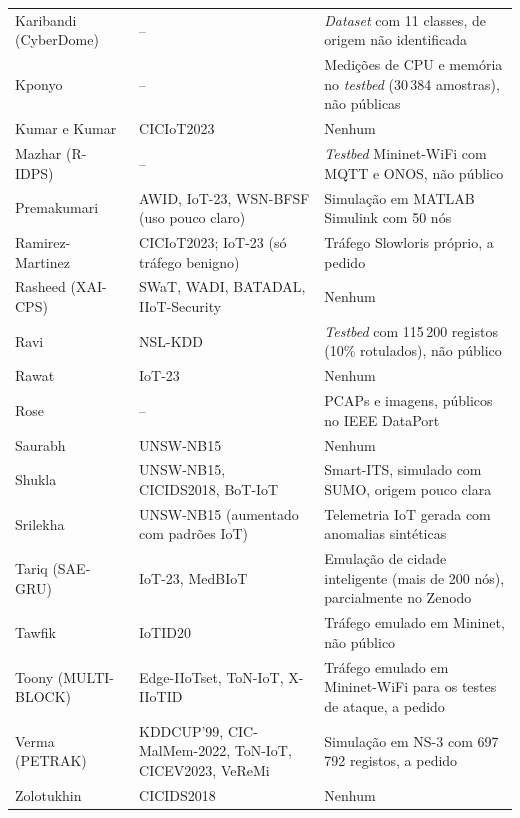 \documentclass[conference,a4paper]{IEEEtran}
\begin{document}
\begin{table}[p]
\begin{tabular}{@{}>{\raggedright\arraybackslash}p{}>{\raggedright\arraybackslash}p{}>{\raggedright\arraybackslash}p{}@{}}
Karibandi (CyberDome)~\cite{karibandi2025cyberdome} & -- & \textit{Dataset} com 11 classes, de origem não identificada \\
Kponyo~\cite{kponyo2020lightweight} & -- & Medições de CPU e memória no \textit{testbed} (30\,384 amostras), não públicas \\
Kumar e Kumar~\cite{kumar2025advanced} & CICIoT2023 & Nenhum \\
Mazhar (R-IDPS)~\cite{mazhar2022ridps} & -- & \textit{Testbed} Mininet-WiFi com MQTT e ONOS, não público \\
Premakumari~\cite{premakumari2025qlearning} & AWID, IoT-23, WSN-BFSF (uso pouco claro) & Simulação em MATLAB Simulink com 50 nós \\
Ramirez-Martinez~\cite{ramirezmartinez2025p4} & CICIoT2023; IoT-23 (só tráfego benigno) & Tráfego Slowloris próprio, a pedido \\
Rasheed (XAI-CPS)~\cite{Rasheed2026} & SWaT, WADI, BATADAL, IIoT-Security & Nenhum \\
Ravi~\cite{ravi2020semisupervised} & NSL-KDD & \textit{Testbed} com 115\,200 registos (10\% rotulados), não público \\
Rawat~\cite{rawat2024intelligent} & IoT-23 & Nenhum \\
Rose~\cite{rose2022ideres} & -- & 913 PCAPs e imagens, públicos no IEEE DataPort \\
Saurabh~\cite{saurabh2022mlaps} & UNSW-NB15 & Nenhum \\
Shukla~\cite{shukla2026cyber} & UNSW-NB15, CICIDS2018, BoT-IoT & Smart-ITS, simulado com SUMO, origem pouco clara \\
Srilekha~\cite{srilekha2025hybrid} & UNSW-NB15 (aumentado com padrões IoT) & Telemetria IoT gerada com anomalias sintéticas \\
Tariq (SAE-GRU)~\cite{tariq2025saegru} & IoT-23, MedBIoT & Emulação de cidade inteligente (mais de 200 nós), parcialmente no Zenodo \\
Tawfik~\cite{tawfik2021internet} & IoTID20 & Tráfego emulado em Mininet, não público \\
Toony (MULTI-BLOCK)~\cite{toony2024multiblock} & Edge-IIoTset, ToN-IoT, X-IIoTID & Tráfego emulado em Mininet-WiFi para os testes de ataque, a pedido \\
Verma (PETRAK)~\cite{verma2024petrak} & KDDCUP'99, CIC-MalMem-2022, ToN-IoT, CICEV2023, VeReMi & Simulação em NS-3 com 697\,792 registos, a pedido \\
Zolotukhin~\cite{zolotukhin2021curious} & CICIDS2018 & Nenhum \\
\bottomrule
\end{tabular}


\end{table}
\end{document}
